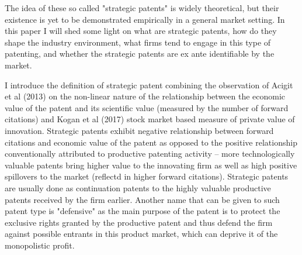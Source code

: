 \documentclass[11pt]{article}
\begin{document}
The idea of these so called "strategic patents" is widely theoretical, but their existence is yet to be demonstrated empirically in a general market setting. In this paper I will shed some light on what are strategic patents, how do they shape the industry environment, what firms tend to engage in this type of patenting, and whether the strategic patents are ex ante identifiable by the market.


I introduce the definition of strategic patent combining the observation of \color{blue} Acigit et al (2013) \color{black} on the non-linear nature of the relationship between the economic value of the patent and its scientific value (measured by the number of forward citations) and \color{blue} Kogan et al (2017)\color{black} stock market based measure of private value of innovation. Strategic patents exhibit negative relationship between forward citations and economic value of the patent as opposed to the positive relationship conventionally attributed to productive patenting activity -- more technologically valuable patents bring higher value to the innovating firm as well as high positive spillovers to the market (reflectd in higher forward citations). Strategic patents are usually done as continuation patents to the highly valuable productive patents received by the firm earlier. Another name that can be given to such patent type is "defensive" as the main purpose of the patent is to protect the exclusive rights granted by the productive patent and thus defend the firm against possible entrants in this product market, which can deprive it of the monopolistic profit. 
\end{document}

